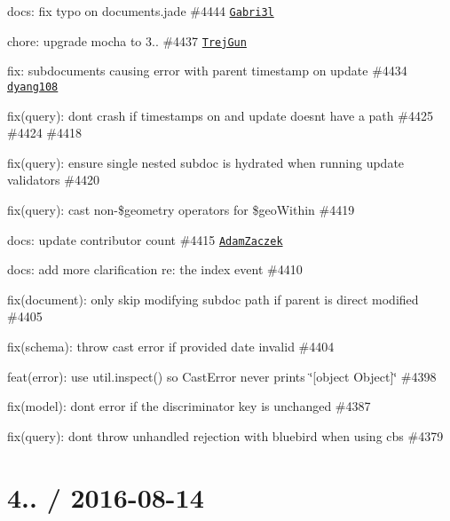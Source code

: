 \begin{DoxyItemize}
\item docs\+: fix typo on documents.\+jade \#4444 \href{https://github.com/Gabri3l}{\tt Gabri3l}
\item chore\+: upgrade mocha to 3.. \#4437 \href{https://github.com/TrejGun}{\tt Trej\+Gun}
\item fix\+: subdocuments causing error with parent timestamp on update \#4434 \href{https://github.com/dyang108}{\tt dyang108}
\item fix(query)\+: don\textquotesingle{}t crash if timestamps on and update doesn\textquotesingle{}t have a path \#4425 \#4424 \#4418
\item fix(query)\+: ensure single nested subdoc is hydrated when running update validators \#4420
\item fix(query)\+: cast non-\/\$geometry operators for \$geo\+Within \#4419
\item docs\+: update contributor count \#4415 \href{https://github.com/AdamZaczek}{\tt Adam\+Zaczek}
\item docs\+: add more clarification re\+: the index event \#4410
\item fix(document)\+: only skip modifying subdoc path if parent is direct modified \#4405
\item fix(schema)\+: throw cast error if provided date invalid \#4404
\item feat(error)\+: use util.\+inspect() so Cast\+Error never prints \char`\"{}\mbox{[}object Object\mbox{]}\char`\"{} \#4398
\item fix(model)\+: dont error if the discriminator key is unchanged \#4387
\item fix(query)\+: don\textquotesingle{}t throw unhandled rejection with bluebird when using cbs \#4379
\end{DoxyItemize}

\section*{4.. / 2016-\/08-\/14 }


